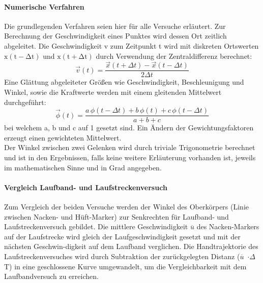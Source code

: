 \paragraph{Numerische Verfahren}
Die grundlegenden Verfahren seien hier für alle Versuche erläutert. Zur Berechnung der Geschwindigkeit eines Punktes wird dessen Ort zeitlich abgeleitet. Die Geschwindigkeit v zum Zeitpunkt t wird mit diskreten Ortswerten $\mathrm{x(t - \Delta{t})}$ und $\mathrm{x(t + \Delta{t})}$ durch Verwendung der Zentraldifferenz berechnet:
\begin{equation}
\vec{v}(t) = \frac{\vec{x}(t + \Delta{t}) - \vec{x}(t - \Delta{t})}{2\Delta{t}}
\end{equation}
Eine Glättung abgeleiteter Größen wie Geschwindigkeit, Beschleunigung und Winkel, sowie die Kraftwerte werden mit einem gleitenden Mittelwert durchgeführt:
\begin{equation}
\vec{\phi}(t) = \frac{a\,\phi(t - \Delta{t}) + b\,\phi(t) + c\,\phi(t - \Delta{t})}{a + b + c}
\end{equation}
bei welchem a, b und c auf 1 gesetzt sind. Ein Ändern der Gewichtungsfaktoren erzeugt einen gewichteten Mittelwert.\\
Der Winkel zwischen zwei Gelenken wird durch triviale Trigonometrie berechnet und ist in den Ergebnissen, falls keine weitere Erläuterung vorhanden ist, jeweils im mathematischen Sinne und in Grad angegeben. 

\paragraph{Vergleich Laufband- und Laufstreckenversuch}
Zum Vergleich der beiden Versuche werden der Winkel des Oberkörpers (Linie zwischen Nacken- und Hüft-Marker) zur Senkrechten für Laufband- und Laufstreckenversuch gebildet. Die mittlere Geschwindigkeit $\overline{u}$ des Nacken-Markers auf der Laufstrecke wird gleich der Laufgeschwindigkeit gesetzt und mit der nächsten Geschwin-digkeit auf dem Laufband verglichen. Die Handtrajektorie des Laufstreckenversuches wird durch Subtraktion der zurückgelegten Distanz ($\overline{u}$~$\cdot\Delta$T) in eine geschlossene Kurve umgewandelt, um die Vergleichbarkeit mit dem Laufbandversuch zu erreichen. 
